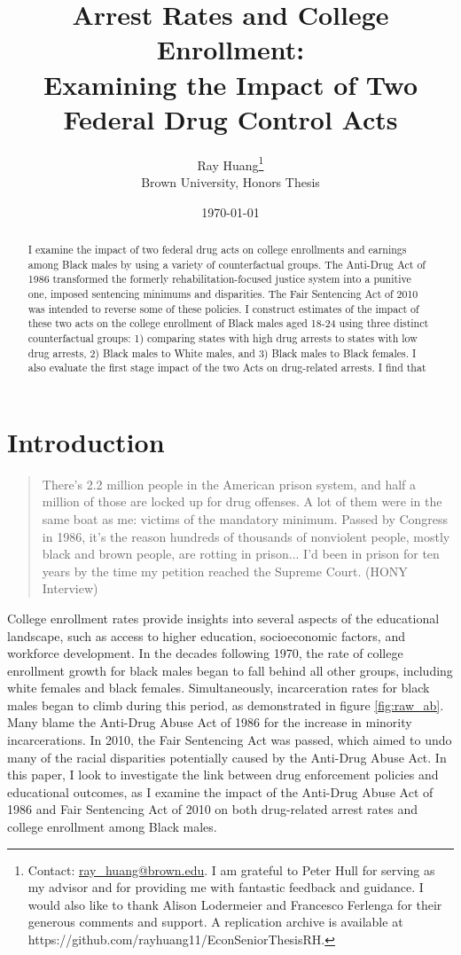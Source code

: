 \documentclass{article}
\title{Arrest Rates and College Enrollment:
\texorpdfstring{\\}{} Examining the Impact of Two Federal Drug Control Acts}
\author{Ray Huang\thanks{Contact:
    \href{mailto:ray_huang@brown.edu}{ray\_huang@brown.edu}.
     I am grateful to Peter Hull for serving as my advisor and for providing me with fantastic feedback and guidance. I would also like to thank Alison Lodermeier and Francesco Ferlenga for their generous comments and support. A replication archive is available at https://github.com/rayhuang11/EconSeniorThesisRH.}
     \\Brown University, Honors Thesis}
\date{\today}
\begin{document}
\maketitle

\begin{abstract}
\noindent I examine the impact of two federal drug acts on college enrollments and earnings among Black males by using a variety of counterfactual groups. The Anti-Drug Act of 1986 transformed the formerly rehabilitation-focused justice system into a punitive one, imposed sentencing minimums and disparities. The Fair Sentencing Act of 2010 was intended to reverse some of these policies. I construct estimates of the impact of these two acts on the college enrollment of Black males aged 18-24 using three distinct counterfactual groups: 1) comparing states with high drug arrests to states with low drug arrests, 2) Black males to White males, and 3) Black males to Black females. I also evaluate the first stage impact of the two Acts on drug-related arrests. I find that

\end{abstract}

\clearpage

\section{Introduction}
 

\begin{quote}
  There’s 2.2 million people in the American prison system, and half a million of those are locked up for drug offenses. A lot of them were in the same boat as me: victims of the mandatory minimum. Passed by Congress in 1986, it’s the reason hundreds of thousands of nonviolent people, mostly black and brown people, are rotting in prison... I’d been in prison for ten years by the time my petition reached the Supreme Court. (HONY Interview)
\end{quote}

College enrollment rates provide insights into several aspects of the educational landscape, such as access to higher education, socioeconomic factors, and workforce development. In the decades following 1970, the rate of college enrollment growth for black males began to fall behind all other groups, including white females and black females. Simultaneously, incarceration rates for black males began to climb during this period, as demonstrated in figure \ref{fig:raw_ab}. Many blame the Anti-Drug Abuse Act of 1986 for the increase in minority incarcerations. In 2010, the Fair Sentencing Act was passed, which aimed to undo many of the racial disparities potentially caused by the Anti-Drug Abuse Act. In this paper, I look to investigate the link between drug enforcement policies and educational outcomes, as I examine the impact of the Anti-Drug Abuse Act of 1986 and Fair Sentencing Act of 2010 on both drug-related arrest rates and college enrollment among Black males.
\end{document}
